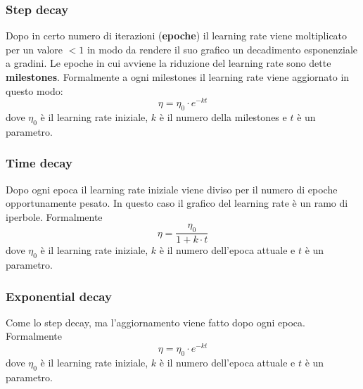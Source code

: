 \subsubsection{Step decay}
Dopo in certo numero di iterazioni (\textbf{epoche}) il learning rate viene moltiplicato per un valore $<1$ in modo da rendere il suo grafico un decadimento esponenziale a gradini. Le epoche in cui avviene la riduzione del learning rate sono dette \textbf{milestones}. Formalmente a ogni milestones il learning rate viene aggiornato in questo modo:
\begin{equation}
	\eta = \eta_0 \cdot e^{-kt}
\end{equation}
dove $\eta_0$ è il learning rate iniziale, $k$ è il numero della milestones e $t$ è un parametro.
\subsubsection{Time decay}
Dopo ogni epoca il learning rate iniziale viene diviso per  il numero di epoche opportunamente pesato. In questo caso il grafico del learning rate è un ramo di iperbole. Formalmente
\begin{equation}
	\eta = \frac{\eta_0}{1 + k\cdot t}
\end{equation}
dove $\eta_0$ è il learning rate iniziale, $k$ è il numero dell'epoca attuale e $t$ è un parametro.
\subsubsection{Exponential decay}
Come lo step decay, ma l'aggiornamento viene fatto dopo ogni epoca. Formalmente
\begin{equation}
	\eta = \eta_0 \cdot e^{-kt}
\end{equation}
dove $\eta_0$ è il learning rate iniziale, $k$ è il numero dell'epoca attuale e $t$ è un parametro.
\newpage

